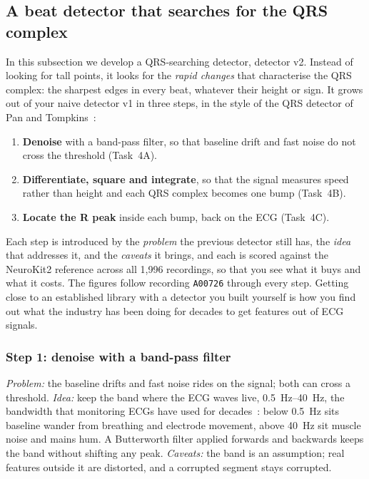 \documentclass[12pt,article,oneside,linkcolour=blue]{oxengthesis}
\newcommand{\nb}[1]{\noindent{\small\textsf{Notebook: #1}}\par\nopagebreak\smallskip}
\begin{document}
\subsection{A beat detector that searches for the QRS complex}
\label{sec:qrs}
\nb{3.3, Tasks 4A--4C}

In this subsection we develop a QRS-searching detector, detector v2. Instead of looking for
tall points, it looks for the \emph{rapid changes} that characterise the QRS complex: the
sharpest edges in every beat, whatever their height or sign. It grows out of your naive
detector v1 in three steps, in the style of the QRS detector of Pan and
Tompkins~\cite{pan1985qrs}:
\begin{enumerate}[leftmargin=*, itemsep=2pt]
  \item \textbf{Denoise} with a band-pass filter, so that baseline drift and fast noise do not
        cross the threshold (Task~4A).
  \item \textbf{Differentiate, square and integrate}, so that the signal measures speed rather
        than height and each QRS complex becomes one bump (Task~4B).
  \item \textbf{Locate the R peak} inside each bump, back on the ECG (Task~4C).
\end{enumerate}
Each step is introduced by the \emph{problem} the previous detector still has, the \emph{idea}
that addresses it, and the \emph{caveats} it brings, and each is scored against the NeuroKit2
reference across all 1,996 recordings, so that you see what it buys and what it costs. The
figures follow recording \texttt{A00726} through every step. Getting close to an established
library with a detector you built yourself is how you find out what the industry has been doing
for decades to get features out of ECG signals.

\subsubsection{Step 1: denoise with a band-pass filter}
\nb{Task 4A}
\emph{Problem:} the baseline drifts and fast noise rides on the signal; both can cross a
threshold. \emph{Idea:} keep the band where the ECG waves live, \SIrange{0.5}{40}{\hertz}, the
bandwidth that monitoring ECGs have used for decades~\cite{kligfield2007ecg}: below
\SI{0.5}{\hertz} sits baseline wander from breathing and electrode movement, above
\SI{40}{\hertz} sit muscle noise and mains hum. A Butterworth filter applied forwards and
backwards keeps the band without shifting any peak.
\emph{Caveats:} the band is an assumption; real features outside it are distorted, and a
corrupted segment stays corrupted.
\end{document}
